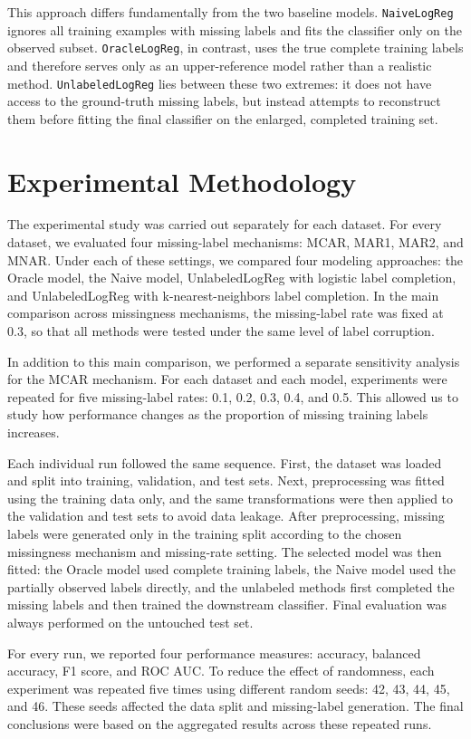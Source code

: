 \documentclass[8pt,a4paper]{extarticle}
\begin{document}
This approach differs fundamentally from the two baseline models. \texttt{NaiveLogReg} ignores all training examples with missing labels and fits the classifier only on the observed subset. \texttt{OracleLogReg}, in contrast, uses the true complete training labels and therefore serves only as an upper-reference model rather than a realistic method. \texttt{UnlabeledLogReg} lies between these two extremes: it does not have access to the ground-truth missing labels, but instead attempts to reconstruct them before fitting the final classifier on the enlarged, completed training set.

\section{Experimental Methodology}
The experimental study was carried out separately for each dataset. For every dataset, we evaluated four missing-label mechanisms: MCAR, MAR1, MAR2, and MNAR. Under each of these settings, we compared four modeling approaches: the Oracle model, the Naive model, UnlabeledLogReg with logistic label completion, and UnlabeledLogReg with k-nearest-neighbors label completion. In the main comparison across missingness mechanisms, the missing-label rate was fixed at 0.3, so that all methods were tested under the same level of label corruption.

In addition to this main comparison, we performed a separate sensitivity analysis for the MCAR mechanism. For each dataset and each model, experiments were repeated for five missing-label rates: 0.1, 0.2, 0.3, 0.4, and 0.5. This allowed us to study how performance changes as the proportion of missing training labels increases.

Each individual run followed the same sequence. First, the dataset was loaded and split into training, validation, and test sets. Next, preprocessing was fitted using the training data only, and the same transformations were then applied to the validation and test sets to avoid data leakage. After preprocessing, missing labels were generated only in the training split according to the chosen missingness mechanism and missing-rate setting. The selected model was then fitted: the Oracle model used complete training labels, the Naive model used the partially observed labels directly, and the unlabeled methods first completed the missing labels and then trained the downstream classifier. Final evaluation was always performed on the untouched test set.

For every run, we reported four performance measures: accuracy, balanced accuracy, F1 score, and ROC AUC. To reduce the effect of randomness, each experiment was repeated five times using different random seeds: 42, 43, 44, 45, and 46. These seeds affected the data split and missing-label generation. The final conclusions were based on the aggregated results across these repeated runs.
\end{document}
